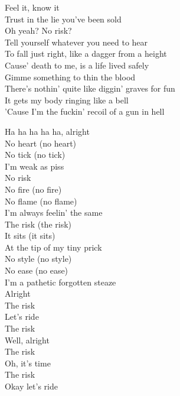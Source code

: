 


Feel it, know it \\
Trust in the lie you've been sold \\
Oh yeah? No risk? \\
Tell yourself whatever you need to hear \\
To fall just right, like a dagger from a height \\
Cause' death to me, is a life lived safely \\

Gimme something to thin the blood \\
There's nothin' quite like diggin' graves for fun \\
It gets my body ringing like a bell \\
'Cause I'm the fuckin' recoil of a gun in hell \\


Ha ha ha ha ha, alright \\
No heart (no heart) \\
No tick (no tick) \\
I'm weak as piss \\
No risk \\
No fire (no fire) \\
No flame (no flame) \\
I'm always feelin' the same \\
The risk (the risk) \\
It sits (it sits) \\
At the tip of my tiny prick \\
No style (no style) \\
No ease (no ease) \\
I'm a pathetic forgotten steaze \\

Alright \\
The risk \\
Let's ride \\
The risk \\
Well, alright \\
The risk \\
Oh, it's time \\
The risk \\
Okay let's ride \\

